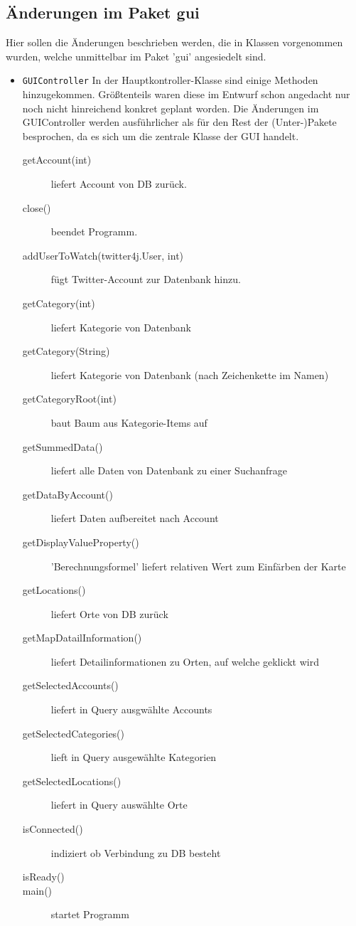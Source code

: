 \subsection{Änderungen im Paket gui}
Hier sollen die Änderungen beschrieben werden, die in Klassen vorgenommen wurden, welche unmittelbar im Paket 'gui' angesiedelt sind.
\begin{itemize}
	\item \lstinline{GUIController}
	\quad 
	In der Hauptkontroller-Klasse sind einige Methoden hinzugekommen. Größtenteils waren diese im Entwurf schon angedacht nur noch nicht hinreichend konkret geplant worden. Die Änderungen im GUIController werden ausführlicher als für den Rest der (Unter-)Pakete besprochen, da es sich um die zentrale Klasse der GUI handelt.
	\begin{description}
		\item[getAccount(int)] liefert Account von DB zurück.
		\item[close()] beendet Programm.
		\item[addUserToWatch(twitter4j.User, int)] fügt Twitter-Account zur Datenbank hinzu.
		\item[getCategory(int)] liefert Kategorie von Datenbank
		\item[getCategory(String)] liefert Kategorie von Datenbank (nach Zeichenkette im Namen)
		\item[getCategoryRoot(int\text{[]})] baut Baum aus Kategorie-Items auf
		\item[getSummedData()] liefert alle Daten von Datenbank zu einer Suchanfrage
		\item[getDataByAccount()] liefert Daten aufbereitet nach Account
		\item[getDisplayValueProperty()] 'Berechnungsformel' liefert relativen Wert zum Einfärben der Karte
		\item[getLocations()] liefert Orte von DB zurück
		\item[getMapDatailInformation()] liefert Detailinformationen zu Orten, auf welche geklickt wird
		\item[getSelectedAccounts()] liefert in Query ausgwählte Accounts
		\item[getSelectedCategories()] lieft in Query ausgewählte Kategorien
		\item[getSelectedLocations()] liefert in Query auswählte Orte
		\item[isConnected()] indiziert ob Verbindung zu DB besteht
		\item[isReady()]
		\item[main()] startet Programm

\end{description}
\end{itemize}

